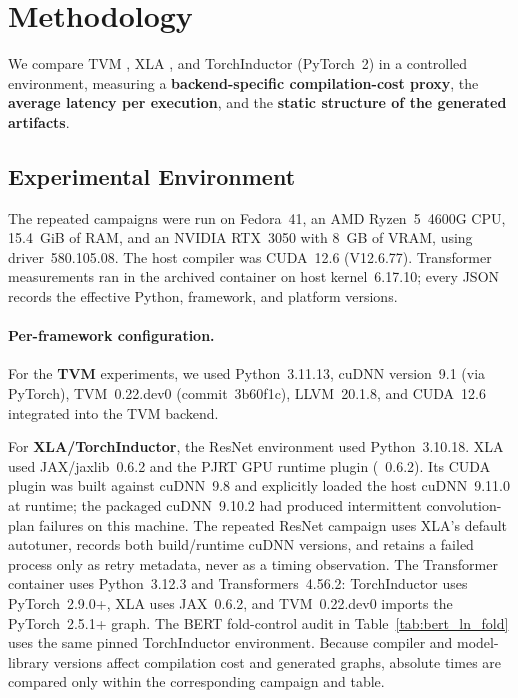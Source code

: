 \documentclass[sigconf]{acmart}
\DeclareRobustCommand{\tcode}[1]{\texttt{\seqsplit{#1}}}
\begin{document}
\section{Methodology}
\label{sec:methodology}

We compare TVM \cite{chen2018tvm}, XLA \cite{snider2023xla}, and TorchInductor (PyTorch~2) \cite{pytorch2022} in a controlled environment, measuring a \textbf{backend-specific compilation-cost proxy}, the \textbf{average latency per execution}, and the \textbf{static structure of the generated artifacts}.

\subsection{Experimental Environment}

The repeated campaigns were run on Fedora~41, an AMD Ryzen~5~4600G CPU, 15.4~GiB of RAM, and an NVIDIA RTX~3050 with 8~GB of VRAM, using driver~580.105.08. The host \tcode{nvcc} compiler was CUDA~12.6 (V12.6.77). Transformer measurements ran in the archived container on host kernel~6.17.10; every JSON records the effective Python, framework, and platform versions.

\paragraph{Per-framework configuration.}
For the \textbf{TVM} experiments, we used Python~3.11.13, cuDNN version~9.1 (via PyTorch), TVM~0.22.dev0 (commit~3b60f1c), LLVM~20.1.8, and CUDA~12.6 integrated into the TVM backend.

For \textbf{XLA/TorchInductor}, the ResNet environment used Python~3.10.18. XLA used JAX/jaxlib~0.6.2 and the PJRT GPU runtime plugin (\tcode{jax-cuda12-pjrt}~0.6.2). Its CUDA plugin was built against cuDNN~9.8 and explicitly loaded the host cuDNN~9.11.0 at runtime; the packaged cuDNN~9.10.2 had produced intermittent convolution-plan failures on this machine. The repeated ResNet campaign uses XLA's default autotuner, records both build/runtime cuDNN versions, and retains a failed process only as retry metadata, never as a timing observation. The Transformer container uses Python~3.12.3 and Transformers~4.56.2: TorchInductor uses PyTorch~2.9.0+\tcode{cu128}, XLA uses JAX~0.6.2, and TVM~0.22.dev0 imports the PyTorch~2.5.1+\tcode{cu124} graph. The BERT fold-control audit in Table~\ref{tab:bert_ln_fold} uses the same pinned TorchInductor environment. Because compiler and model-library versions affect compilation cost and generated graphs, absolute times are compared only within the corresponding campaign and table.
\end{document}
